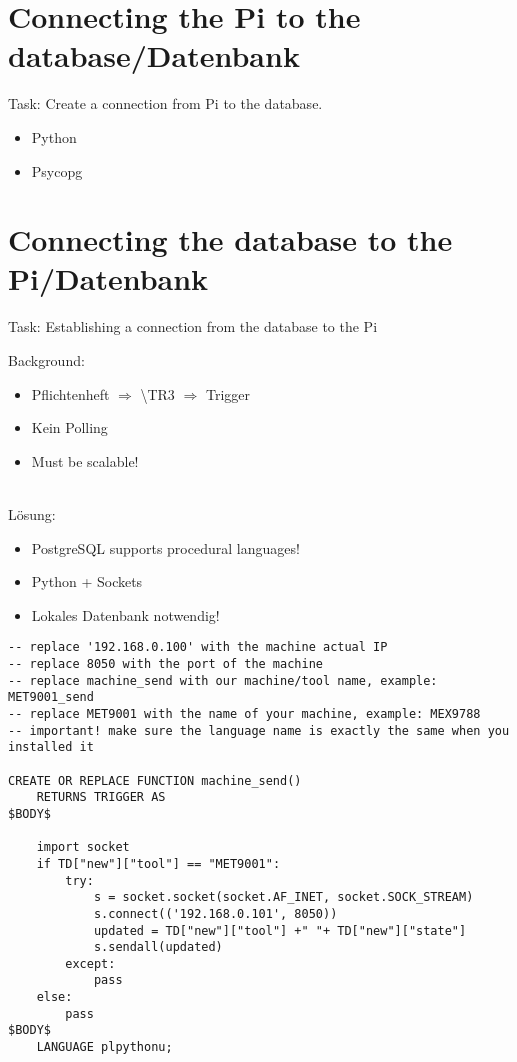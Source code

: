 \documentclass[ignorenonframetext, 11pt, table]{beamer}
\begin{document}
\section*{Connecting the Pi to the database/Datenbank}
\begin{frame}
Task: Create a connection from Pi to the database.\newline\pause

\begin{itemize}
\item Python\pause
\item Psycopg
\end{itemize}
\end{frame}

\section*{Connecting the database to the Pi/Datenbank}
\begin{frame}
Task: Establishing a connection from the database to the Pi\newline\pause

Background:\pause
\begin{itemize}
\item Pflichtenheft $\Rightarrow$ \textbackslash TR3 $\Rightarrow$ Trigger\pause
\item Kein Polling\pause
\item Must be scalable!\pause
\end{itemize}
~\\
Lösung:\pause
\begin{itemize}
\item PostgreSQL supports procedural languages!\pause
\item Python + Sockets\pause
\item Lokales Datenbank notwendig!
\end{itemize}
\end{frame}

\begin{frame}[fragile]
\begin{lstlisting}[label=trigger-func, basicstyle=\tiny]
-- replace '192.168.0.100' with the machine actual IP
-- replace 8050 with the port of the machine 
-- replace machine_send with our machine/tool name, example: MET9001_send
-- replace MET9001 with the name of your machine, example: MEX9788
-- important! make sure the language name is exactly the same when you installed it

CREATE OR REPLACE FUNCTION machine_send()  
    RETURNS TRIGGER AS
$BODY$

    import socket
    if TD["new"]["tool"] == "MET9001": 
        try:
            s = socket.socket(socket.AF_INET, socket.SOCK_STREAM)
            s.connect(('192.168.0.101', 8050)) 
            updated = TD["new"]["tool"] +" "+ TD["new"]["state"]
            s.sendall(updated)
        except:
            pass
    else:
        pass
$BODY$
    LANGUAGE plpythonu;
\end{lstlisting}
\end{frame}
\end{document}
